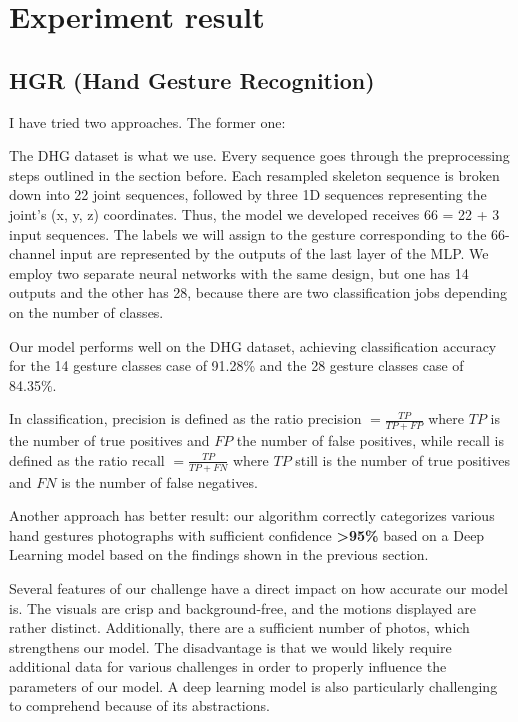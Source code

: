 \documentclass[letterpaper, 10 pt, conference]{ieeeconf}  %
\begin{document}
\section{\bf Experiment result}
\subsection*{\bf HGR (Hand Gesture Recognition)}
I have tried two approaches. The former one: \par 
The DHG dataset is what we use. Every sequence goes through the preprocessing steps outlined in the section before. Each resampled skeleton sequence is broken down into 22 joint sequences, followed by three 1D sequences representing the joint's (x, y, z) coordinates. Thus, the model we developed receives 66 = 22 + 3 input sequences. The labels we will assign to the gesture corresponding to the 66-channel input are represented by the outputs of the last layer of the MLP. We employ two separate neural networks with the same design, but one has 14 outputs and the other has 28, because there are two classification jobs depending on the number of classes. \par

Our model performs well on the DHG dataset, achieving classification accuracy for the 14 gesture classes case of 91.28\% and the 28 gesture classes case of 84.35\%. \par

In classification, precision is defined as the ratio
precision $= \frac{TP}{TP + FP}$ where $TP$ is the number of true positives and $FP$ the number of false positives, while recall is defined as the ratio recall $=\frac{TP}{TP+FN}$ where $TP$ still is the number of true positives and $FN$ is the number of false negatives.

Another approach has better result: our algorithm correctly categorizes various hand gestures photographs with sufficient confidence {\bf >95\%} based on a Deep Learning model based on the findings shown in the previous section. \par

Several features of our challenge have a direct impact on how accurate our model is. The visuals are crisp and background-free, and the motions displayed are rather distinct. Additionally, there are a sufficient number of photos, which strengthens our model. The disadvantage is that we would likely require additional data for various challenges in order to properly influence the parameters of our model. A deep learning model is also particularly challenging to comprehend because of its abstractions. \par
\end{document}
